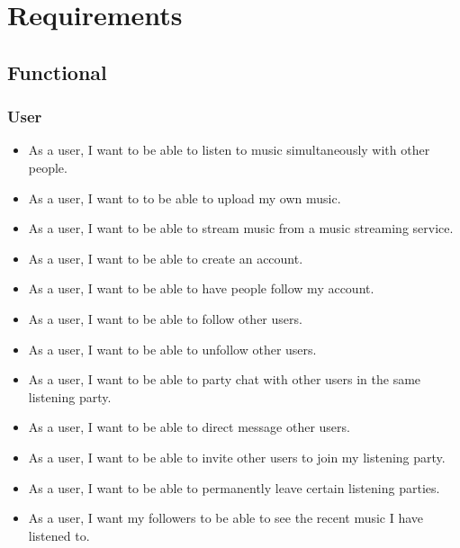\documentclass{article}
\begin{document}
\section{Requirements}
\subsection{Functional}

\subsubsection{User}
\begin{itemize}
    \item As a user, I want to be able to listen to music simultaneously with other people.
    
    \item As a user, I want to to be able to upload my own music.
    
    \item As a user, I want to be able to stream music from a music streaming service.
    
    \item As a user, I want to be able to create an account.

    \item As a user, I want to be able to have people follow my account.

    \item As a user, I want to be able to follow other users.
    
    \item As a user, I want to be able to unfollow other users.
    
    \item As a user, I want to be able to party chat with other users in the same listening party.
    
    \item As a user, I want to be able to direct message other users.
    
    \item As a user, I want to be able to invite other users to join my listening party.
    
    \item As a user, I want to be able to permanently leave certain listening parties.
    
    \item As a user, I want my followers to be able to see the recent music I have listened to.
    

\end{itemize}
\end{document}
